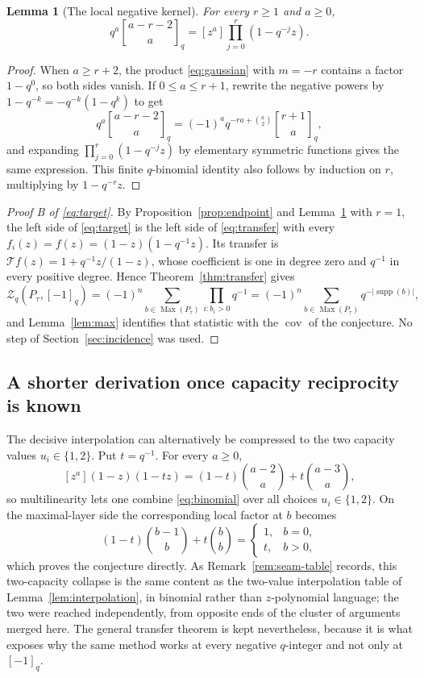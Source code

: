 \documentclass[11pt]{article}
\numberwithin{equation}{section}
\newtheorem{lemma}[theorem]{Lemma}
\theoremstyle{definition}
\theoremstyle{remark}
\newcommand{\supp}{\operatorname{supp}}
\newcommand{\Max}{\operatorname{Max}}
\newcommand{\cov}{\operatorname{cov}}
\newcommand{\Tr}{\mathcal T}
\newcommand{\qint}[1]{[#1]_q}
\newcommand{\Zeta}{\mathcal Z}
\newcommand{\qbinom}[2]{\genfrac{[}{]}{0pt}{}{#1}{#2}_{q}}
\begin{document}
\begin{lemma}[The local negative kernel]
\label{lem:kernel}
For every $r\ge1$ and $a\ge0$,
\begin{equation}
 q^a\qbinom{a-r-2}{a}=[z^a]\prod_{j=0}^r(1-q^{-j}z).
 \label{eq:negativekernel}
\end{equation}
\end{lemma}

\begin{proof}
When $a\ge r+2$, the product \eqref{eq:gaussian} with $m=-r$ contains a factor
$1-q^0$, so both sides vanish. If $0\le a\le r+1$, rewrite the negative powers
by $1-q^{-k}=-q^{-k}(1-q^k)$ to get
\[
 q^a\qbinom{a-r-2}{a}=(-1)^aq^{-ra+\binom a2}\qbinom{r+1}{a},
\]
and expanding $\prod_{j=0}^r(1-q^{-j}z)$ by elementary symmetric functions
gives the same expression. This finite $q$-binomial identity also follows by
induction on $r$, multiplying by $1-q^{-r}z$.
\end{proof}

\begin{proof}[Proof B of \eqref{eq:target}]
By Proposition~\ref{prop:endpoint} and Lemma~\ref{lem:kernel} with $r=1$, the
left side of \eqref{eq:target} is the left side of \eqref{eq:transfer} with
every $f_i(z)=f(z)=(1-z)(1-q^{-1}z)$. Its transfer is
$\Tr f(z)=1+q^{-1}z/(1-z)$, whose coefficient is one in degree zero and
$q^{-1}$ in every positive degree. Hence Theorem~\ref{thm:transfer} gives
\[
 \Zeta_q(P_\tau,\qint{-1})
 =(-1)^n\sum_{b\in \Max(P_\tau)}\prod_{i:b_i>0}q^{-1}
 =(-1)^n\sum_{b\in\Max(P_\tau)}q^{-|\supp(b)|},
\]
and Lemma~\ref{lem:max} identifies that statistic with the $\cov$ of the
conjecture. No step of Section~\ref{sec:incidence} was used.
\end{proof}

\subsection{A shorter derivation once capacity reciprocity is known}
\label{sec:two-capacity}

The decisive interpolation can alternatively be compressed to the two capacity
values $u_i\in\{1,2\}$. Put $t=q^{-1}$. For every $a\ge0$,
\[
 [z^a](1-z)(1-tz)=(1-t)\binom{a-2}{a}+t\binom{a-3}{a},
\]
so multilinearity lets one combine \eqref{eq:binomial} over all choices
$u_i\in\{1,2\}$. On the maximal-layer side the corresponding local factor at
$b$ becomes
\[
 (1-t)\binom{b-1}{b}+t\binom bb
 =\begin{cases}1,&b=0,\\t,&b>0,\end{cases}
\]
which proves the conjecture directly. As Remark~\ref{rem:seam-table} records,
this two-capacity collapse is the same content as the two-value interpolation
table of Lemma~\ref{lem:interpolation}, in binomial rather than
$z$-polynomial language; the two were reached independently, from opposite
ends of the cluster of arguments merged here. The general transfer theorem is
kept nevertheless, because it is what exposes why the same method works at
every negative $q$-integer and not only at $\qint{-1}$.
\end{document}
